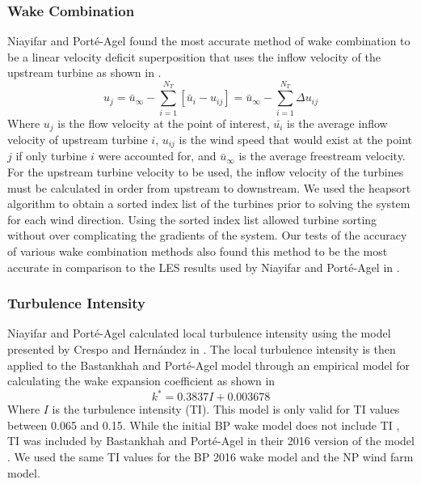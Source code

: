 \documentclass[conf]{new-aiaa}
\begin{document}
\subsubsection{Wake Combination}
Niayifar and Port\'{e}-Agel found the most accurate method of wake combination to be a linear velocity deficit superposition that uses the inflow velocity of the upstream turbine as shown in . 
%
\begin{equation}\label{eq:wake-comb-lin}
	u_j = \bar{u}_\infty - \sum_{i=1}^{N_T} [\bar{u}_i - u_{ij}] = \bar{u}_\infty - \sum_{i=1}^{N_T} \Delta u_{ij}
\end{equation}
%
Where $u_j$ is the flow velocity at the point of interest, $\bar{u_i}$ is the average inflow velocity of upstream turbine $i$, $u_{ij}$ is the wind speed that would exist at the point $j$ if only turbine $i$ were accounted for, and $\bar{u}_{\infty}$ is the average freestream velocity. For the upstream turbine velocity to be used, the inflow velocity of the turbines must be calculated in order from upstream to downstream. We used the heapsort algorithm to obtain a sorted index list of the turbines prior to solving the system for each wind direction. Using the sorted index list allowed turbine sorting without over complicating the gradients of the system. Our tests of the accuracy of various wake combination methods also found this method to be the most accurate in comparison to the LES results used by Niayifar and Port\'{e}-Agel in \cite{niayifar2016}.

\subsubsection{Turbulence Intensity}
Niayifar and Port\'{e}-Agel calculated local turbulence intensity using the model presented by Crespo and Hern\'{a}ndez in \cite{crespo1996}. The local turbulence intensity is then applied to the Bastankhah and Port\'{e}-Agel model through an empirical model for calculating the wake expansion coefficient as shown in  \cite{niayifar2016}
 \begin{equation} \label{eq:ti_npa}
 	k^* = 0.3837 I + 0.003678
 \end{equation}
%
Where $I$ is the turbulence intensity (TI). This model is only valid for TI values between 0.065 and 0.15. While the initial BP wake model does not include TI \cite{bastankhah2014}, TI was included by Bastankhah and Port\'{e}-Agel in their 2016 version of the model \cite{bastankhah2016}. We used the same TI values for the BP 2016 wake model and the NP wind farm model. 
\end{document}
